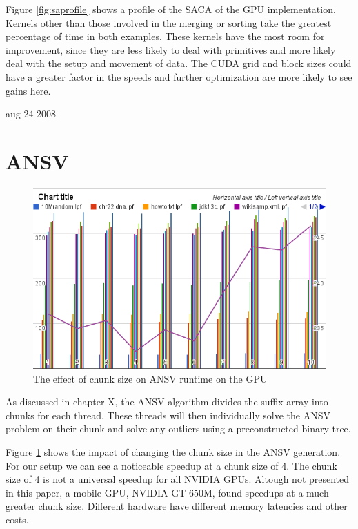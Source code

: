 Figure \ref{fig:saprofile} shows a profile of the SACA of the GPU implementation.
Kernels other than those involved in the merging or sorting take the greatest percentage of time in both examples.
These kernels have the most room for improvement, since they are less likely to deal with primitives and more likely deal with the setup and movement of data.
The CUDA grid and block sizes could have a greater factor in the speeds and further optimization are more likely to see gains here.

aug 24 2008

\section{ANSV}

\begin{figure}[ht!]
\centering
\includegraphics[width=1.0\textwidth]{images/ansvsize.png}
\caption{The effect of chunk size on ANSV runtime on the GPU}
\label{fig:ansvresult}
\end{figure}

As discussed in chapter X, the ANSV algorithm divides the suffix array into chunks for each thread.
These threads will then individually solve the ANSV problem on their chunk and solve any outliers using a preconstructed binary tree.

Figure \ref{fig:ansvresult} shows the impact of changing the chunk size in the ANSV generation.
For our setup we can see a noticeable speedup at a chunk size of 4.
The chunk size of 4 is not a universal speedup for all NVIDIA GPUs.
Altough not presented in this paper, a mobile GPU, NVIDIA GT 650M, found speedups at a much greater chunk size.
Different hardware have different memory latencies and other costs.

